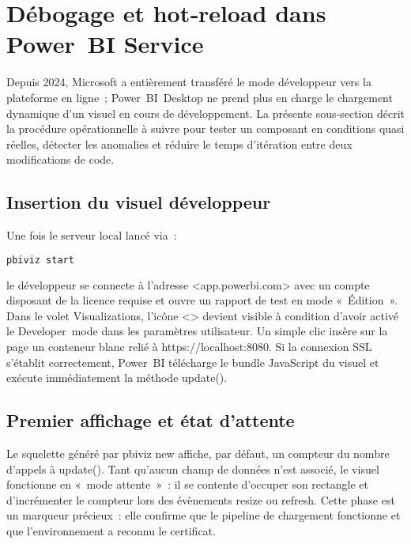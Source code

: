 
\section{Débogage et hot‑reload dans Power BI Service}\label{sec:ch4_debug}

Depuis 2024, Microsoft a entièrement transféré le mode développeur vers la plateforme en ligne ; Power BI Desktop ne prend plus en charge le chargement dynamique d’un visuel en cours de développement. La présente sous‑section décrit la procédure opérationnelle à suivre pour tester un composant en conditions quasi réelles, détecter les anomalies et réduire le temps d’itération entre deux modifications de code.

\subsection{Insertion du visuel développeur}

Une fois le serveur local lancé via :\vspace{-1ex}
\begin{lstlisting}[language=bash]
pbiviz start
\end{lstlisting}
le développeur se connecte à l’adresse <app.powerbi.com> avec un compte disposant de la licence requise et ouvre un rapport de test en mode « Édition ». Dans le volet Visualizations, l’icône <> devient visible à condition d’avoir activé le Developer mode dans les paramètres utilisateur. Un simple clic insère sur la page un conteneur blanc relié à https://localhost:8080. Si la connexion SSL s’établit correctement, Power BI télécharge le bundle JavaScript du visuel et exécute immédiatement la méthode update().

\subsection{Premier affichage et état d’attente}

Le squelette généré par pbiviz new affiche, par défaut, un compteur du nombre d’appels à update(). Tant qu’aucun champ de données n’est associé, le visuel fonctionne en « mode attente » : il se contente d’occuper son rectangle et d’incrémenter le compteur lors des évènements resize ou refresh. Cette phase est un marqueur précieux : elle confirme que le pipeline de chargement fonctionne et que l’environnement a reconnu le certificat.


